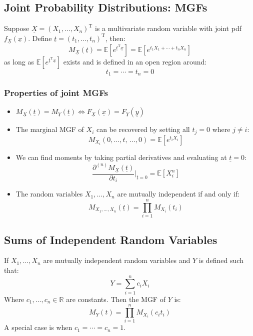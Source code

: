 \documentclass[12pt]{article}
\newcommand{\pf}[2]{\frac{\partial #1}{\partial #2}}
\begin{document}
\subsection{Joint Probability Distributions: MGFs}
Suppose \(\underline{X}=(X_1,\dots,X_n)^\mathrm{T}\) is a multivariate random variable with joint pdf \(f_{\underline{X}}(\underline{x})\). Define \(\underline{t}=(t_1,\dots,t_n)^\mathrm{T}\), then:
\[M_{\underline{X}}(\underline{t})=\mathbb{E}[e^{\underline{t}^{\mathrm{T}}\underline{x}}]=\mathbb{E}[e^{t_1X_1+\cdots+t_nX_n}]\]
as long as \(\mathbb{E}[e^{\underline{t}^{\mathrm{T}}\underline{x}}]\) exists and is defined in an open region around:
\[t_1=\cdots = t_n=0\]
\subsubsection{Properties of joint MGFs}
\begin{itemize}
    \item \(M_{\underline{X}}(\underline{t})=M_{\underline{Y}}(\underline{t})\iff F_{\underline{X}}(\underline{x})=F_{\underline{Y}}(\underline{y})\)
    \item The marginal MGF of \(X_i\) can be recovered by setting all \(t_j=0\) where \(j\ne i\):
    \[M_{X_i}(0,\dots,t,\,\dots,0)=\mathbb{E}[e^{t_iX_i}]\]
    \item We can find moments by taking partial derivatives and evaluating at \(\underline{t}=0\):
    \[\pf{^{(n)}M_{\underline{X}}(\underline{t})}{t_i}\bigr|_{\underline{t}=0}=\mathbb{E}[X_i^n]\]
    \item The random variables \(X_1,\dots,X_n\) are mutually independent if and only if:
    \[M_{X_1,\dots,X_n}(\underline{t})=\prod^n_{i=1}M_{X_i}(t_i)\]
\end{itemize}
\subsection{Sums of Independent Random Variables}
If \(X_1,\dots, X_n\) are mutually independent random variables and \(Y\) is defined such that:
\[Y=\sum^n_{i=1}c_iX_i\]
Where \(c_1,\dots,c_n\in\mathbb{R}\) are constants. Then the MGF of \(Y\) is:
\[M_Y(t)=\prod^n_{i=1}M_{X_i}(c_it_i)\]
A special case is when \(c_1=\cdots=c_n=1\).
\end{document}
